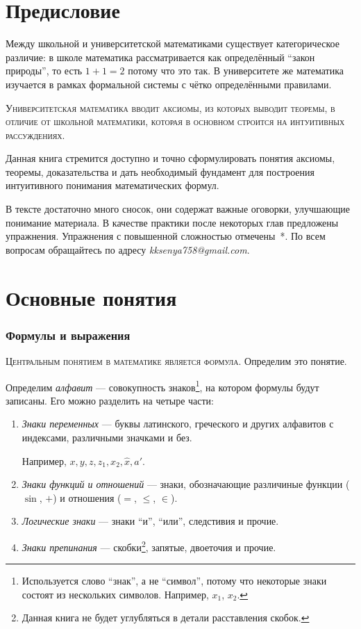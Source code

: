 \part{Предисловие}

Между школьной и университетской математиками существует категорическое
различие: в школе математика рассматривается как определённый ``закон природы'',
то есть $1+1=2$ потому что это так. В университете же математика изучается
в рамках формальной системы с чётко определёнными правилами.

\textsc{Университетская математика вводит аксиомы, из которых выводит теоремы,
	в отличие от школьной математики, которая
	в основном строится на интуитивных рассуждениях.}

Данная книга стремится доступно и точно сформулировать понятия аксиомы,
теоремы, доказательства и дать необходимый фундамент для построения
интуитивного понимания математических формул.

В тексте достаточно много сносок, они содержат важные оговорки,
улучшающие понимание материала. В качестве практики
после некоторых глав предложены упражнения. Упражнения с повышенной сложностью
отмечены~*.
По всем вопросам обращайтесь по адресу {\sl kksenya758@gmail.com}.

\part{Основные понятия}

\section{Формулы и выражения}

\textsc{Центральным понятием в математике является формула.}
Определим это понятие.

Определим {\it алфавит} --- совокупность знаков\footnote{
	Используется слово ``знак'', а не ``символ'', потому что некоторые знаки
	состоят из нескольких символов. Например, $x_1$, $x_2$.},
на котором формулы будут записаны. Его можно разделить на четыре части:
\begin{enumerate}
	\item{}{\it Знаки переменных} --- буквы латинского,
	греческого и других алфавитов с индексами, различными значками и без.

	Например, $x,y,z,z_1,x_2,\hat x,a'$.

	\item{}{\it Знаки функций и отношений}
	--- знаки, обозначающие
	различиные функции ($\sin$, $+$) и отношения ($=$, $\leq$, $\in$).

	\item{}{\it Логические знаки}
	--- знаки ``и'', ``или'', следстивия и прочие.

	\item{}{\it Знаки препинания} --- скобки\footnote{
		Данная книга не будет углубляться в детали расставления скобок.
	}, запятые, двоеточия и прочие.
\end{enumerate}

